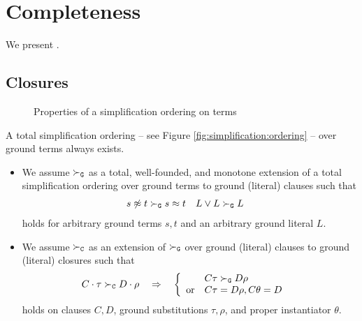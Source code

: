 
\chapter{Completeness}

We present \cite{Ganzinger2004}.

\section{Closures}

\begin{figure}\label{fig:simplification:ordering}
    \begin{center}

\caption{Properties of a simplification ordering on terms}
    \end{center}
\end{figure}





\begin{definition}
    A total simplification ordering
    – see Figure \vref{fig:simplification:ordering} –
    over ground terms always exists.

    \begin{itemize}
        \item We assume $\mathrel\succ_{\mathtt{G}}$ as a
        total, well-founded, and monotone extension of a
        total simplification ordering \cite{NR2001} over ground terms to ground (literal) clauses
        such that
        \begin{align*}
            s\not\approx t &\mathrel\succ_{\mathtt{G}} s\approx t &
            L\lor L &\mathrel\succ_{\mathtt{G}} L
        \end{align*}
        holds for arbitrary ground terms $s,t$ and an arbitrary ground literal $L$.

        \item We assume $\mathrel\succ_{\mathtt{C}}$ as an extension of $\mathrel\succ_{\mathtt{G}}$
        over ground (literal) clauses to ground (literal) closures
        such that
        \begin{align*}
            C\cdot\tau\mathrel\succ_{\mathtt{C}} D\cdot\rho
            \quad&\Rightarrow\quad
            \left\{
            \begin{array}{ll}
                &C\tau\mathrel\succ_{\mathtt{G}} D\rho
                \\
                \text{or}&C\tau=D\rho, C\theta=D
            \end{array}
            \right.
        \end{align*}
        holds on clauses $C,D$, ground substitutions $\tau,\rho$,
        and proper instantiator $\theta$.
    \end{itemize}

\end{definition}